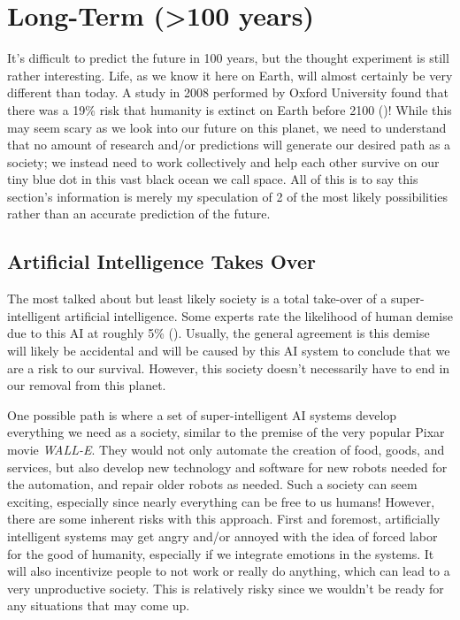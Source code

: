 \section{Long-Term (>100 years)}
\label{sec:long}

It's difficult to predict the future in 100 years, but the thought experiment is still rather interesting. Life, as we know it here on Earth, will almost certainly be very different than today. A study in 2008 performed by Oxford University found that there was a 19\% risk that humanity is extinct on Earth before 2100 (\cite{WeDead100Years})! While this may seem scary as we look into our future on this planet, we need to understand that no amount of research and/or predictions will generate our desired path as a society; we instead need to work collectively and help each other survive on our tiny blue dot in this vast black ocean we call space. All of this is to say this section's information is merely my speculation of 2 of the most likely possibilities rather than an accurate prediction of the future.

\subsection{Artificial Intelligence Takes Over}

The most talked about but least likely society is a total take-over of a super-intelligent artificial intelligence. Some experts rate the likelihood of human demise due to this AI at roughly 5\% (\cite{WeDead100Years}). Usually, the general agreement is this demise will likely be accidental and will be caused by this AI system to conclude that we are a risk to our survival. However, this society doesn't necessarily have to end in our removal from this planet.

One possible path is where a set of super-intelligent AI systems develop everything we need as a society, similar to the premise of the very popular Pixar movie \emph{WALL-E}. They would not only automate the creation of food, goods, and services, but also develop new technology and software for new robots needed for the automation, and repair older robots as needed. Such a society can seem exciting, especially since nearly everything can be free to us humans! However, there are some inherent risks with this approach. First and foremost, artificially intelligent systems may get angry and/or annoyed with the idea of forced labor for the good of humanity, especially if we integrate emotions in the systems. It will also incentivize people to not work or really do anything, which can lead to a very unproductive society. This is relatively risky since we wouldn't be ready for any situations that may come up.

